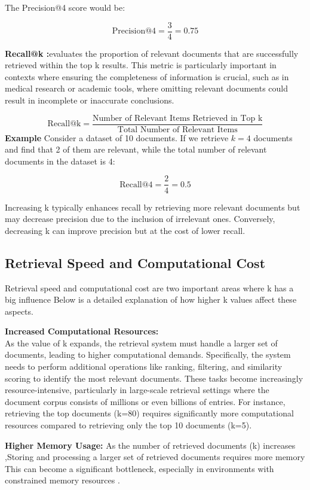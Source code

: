 The Precision@4 score would be:

\[
\text{Precision@4} = \frac{3}{4} = 0.75
\]


\textbf{Recall@k :}evaluates the proportion of relevant documents that are successfully retrieved within the top k results. This metric is particularly important in contexts where ensuring the completeness of information is crucial, such as in medical research or academic tools, where omitting relevant documents could result in incomplete or inaccurate conclusions\cite{deconvoluteai2024metrics}.

\[
\text{Recall@k} = \frac{\text{Number of Relevant Items Retrieved in Top k}}{\text{Total Number of Relevant Items}}
\]
\newline
\textbf{Example}
Consider a dataset of 10 documents. If we retrieve \( k = 4 \) documents and find that 2 of them are relevant, while the total number of relevant documents in the dataset is 4:

\[
\text{Recall@4} = \frac{2}{4} = 0.5
\]


Increasing k typically enhances recall by retrieving more relevant documents but may decrease precision due to the inclusion of irrelevant ones. Conversely, decreasing k can improve precision but at the cost of lower recall. 
\subsection{Retrieval Speed and Computational Cost}
Retrieval speed and computational cost are two important areas where k has a big influence Below is a detailed explanation of how higher k values affect these aspects.

\textbf{Increased Computational Resources:} \\
As the value of k expands, the retrieval system must handle a larger set of documents, leading to higher computational demands. Specifically, the system needs to perform additional operations like ranking, filtering, and similarity scoring to identify the most relevant documents. These tasks become increasingly resource-intensive, particularly in large-scale retrieval settings where the document corpus consists of millions or even billions of entries\cite{manning2008ir}. For instance, retrieving the top  documents (k=80) requires significantly more computational resources compared to retrieving only the top 10 documents (k=5). 

\textbf{Higher Memory Usage:}
As the number of retrieved documents (k) increases ,Storing and processing a larger set of retrieved documents requires more memory This can become a significant bottleneck, especially in environments with constrained memory resources .


